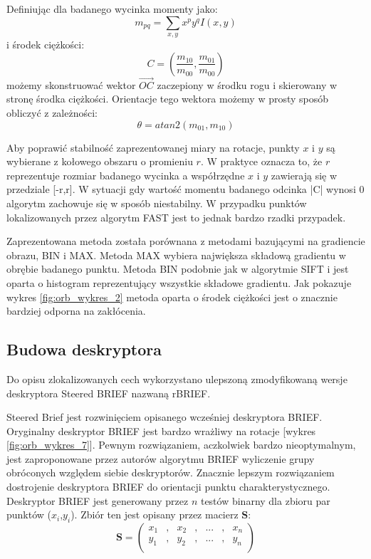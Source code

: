 Definiując dla badanego wycinka momenty jako:
\begin{equation}
m_{pq} = \sum\limits_{x,y} x^p y^q I(x,y)
\end{equation}
i środek ciężkości:
\begin{equation}
C = \left(\frac{m_{10}}{m_{00}},\frac{m_{01}}{m_{00}}\right)
\end{equation}
możemy skonstruować wektor $\overrightarrow{OC}$ zaczepiony w środku rogu i skierowany w stronę środka ciężkości. Orientacje tego wektora możemy w prosty sposób obliczyć z zależności:
\begin{equation}
\theta = atan2(m_{01},m_{10})
\end{equation}

Aby poprawić stabilność zaprezentowanej miary na rotacje, punkty $x$ i $y$ są wybierane z kołowego obszaru o promieniu $r$. W praktyce oznacza to, że $r$ reprezentuje rozmiar badanego wycinka a współrzędne $x$ i $y$ zawierają się w przedziale [-r,r]. W sytuacji gdy wartość momentu badanego odcinka |C| wynosi 0 algorytm zachowuje się w sposób niestabilny. W przypadku punktów lokalizowanych przez algorytm FAST jest to jednak bardzo rzadki przypadek.

Zaprezentowana metoda została porównana z metodami bazującymi na gradiencie obrazu, BIN i MAX. Metoda MAX wybiera największa składową gradientu w obrębie badanego punktu. Metoda BIN podobnie jak w algorytmie SIFT i jest oparta o histogram reprezentujący wszystkie składowe gradientu. Jak pokazuje wykres \ref{fig:orb_wykres_2} metoda oparta o środek ciężkości jest o znacznie bardziej odporna na zakłócenia.
\subsection{Budowa deskryptora}
Do opisu zlokalizowanych cech wykorzystano ulepszoną zmodyfikowaną wersje deskryptora Steered BRIEF nazwaną rBRIEF. 

Steered Brief jest rozwinięciem opisanego wcześniej deskryptora BRIEF. Oryginalny deskryptor BRIEF jest bardzo wrażliwy na rotacje [wykres \ref{fig:orb_wykres_7}]. Pewnym rozwiązaniem, aczkolwiek bardzo nieoptymalnym, jest zaproponowane przez autorów algorytmu BRIEF wyliczenie grupy obróconych względem siebie deskryptorów. Znacznie lepszym rozwiązaniem dostrojenie deskryptora BRIEF do orientacji punktu charakterystycznego. Deskryptor BRIEF jest generowany przez $n$ testów binarny dla zbioru par punktów ($x_i$,$y_i$). Zbiór ten jest opisany przez macierz $\textbf{S}$:
\begin{equation}
\textbf{S} = \left(\begin{array}{ccccccc}
x_1 & , & x_2 & , & ... & , & x_n \\
y_1 & , & y_2 & , & ... & , & y_n \\
\end{array}
\right)
\end{equation} 

